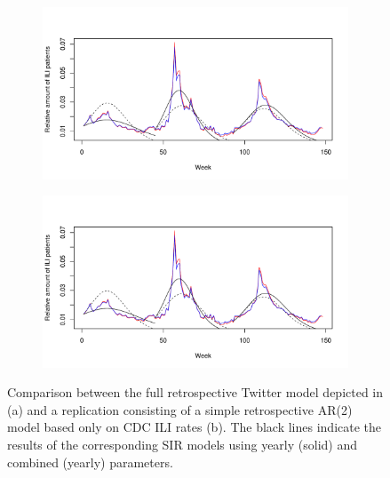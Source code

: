 \documentclass[11pt, a4paper,twoside]{report}\usepackage[]{graphicx}\usepackage[]{color}
\begin{document}
\begin{figure}[H]
\centering
  \begin{subfigure}[t]{1\textwidth}
  \includegraphics[width=1\linewidth]{40_SIR_model_full_both_25_colorised.pdf}
  \caption{}
  \end{subfigure}
  
  \begin{subfigure}[t]{1\textwidth}
  \includegraphics[width=1\linewidth]{41_SIR_model_full_AR2_100_colorised.pdf}
  \caption{}
  \label{fig:TwitterModel_comparison_base_model}
  \end{subfigure}
  \caption{Comparison between the full retrospective Twitter model depicted in \cite{bodnar_data_2015} (a) and a replication consisting of a simple retrospective AR(2) model based only on CDC ILI rates (b). The black lines indicate the results of the corresponding SIR models using yearly (solid) and combined (yearly) parameters.}
  \label{fig:TwitterModel_comparison_ar}
\end{figure}
\end{document}
